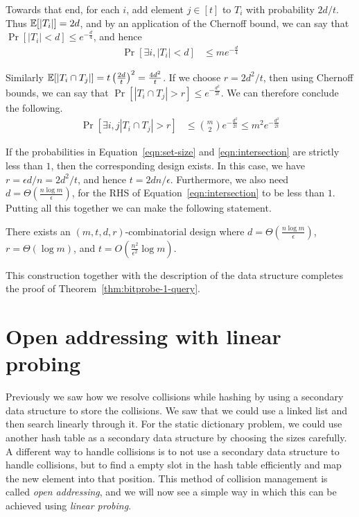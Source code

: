 Towards that end, for each $i$, add element $j\in [t]$ to $T_i$ with probability
$2d/t$. Thus $\mathbb{E}[|T_i|] = 2d$, and by an application of the Chernoff bound, we
can say that $\Pr\left[|T_i| < d \right] \leq e^{-\frac{d}{4}}$, and hence
\begin{align}
  \Pr\left[ \exists i, |T_i| < d \right] &\leq m e^{-\frac{d}{4}}
  \label{eqn:set-size}                                         
\end{align}

Similarly $\mathbb{E}[|T_i \cap T_j|] = t\left(\frac{2d}{t}\right)^2 =
\frac{4d^2}{t}$. If we choose $r = 2d^2/t$, then using Chernoff bounds, we can
say that $\Pr[|T_i \cap T_j| > r] \leq e^{-\frac{d^2}{2t}}$. We can therefore
conclude the following.
\begin{align}
  \Pr[ \exists i,j |T_i \cap T_j| > r] &\leq \binom{m}{2} e^{-\frac{d^2}{2t}} \leq m^2 e^{-\frac{d^2}{2t}}
  \label{eqn:intersection}
\end{align}

If the probabilities in Equation~\ref{eqn:set-size} and \ref{eqn:intersection}
are strictly less than $1$, then the corresponding design exists. In this case,
we have $r = \epsilon d/n = 2d^2 /t$, and hence $t = 2dn/\epsilon$. Furthermore,
we also need $d = \Theta\left(\frac{n\log m}{\epsilon} \right)$, for the RHS of
Equation~\ref{eqn:intersection} to be less than $1$. Putting all this together
we can make the following statement.
\begin{lemma}
  There exists an $(m,t,d,r)$-combinatorial design where
  $d = \Theta\left(\frac{n\log m}{\epsilon} \right)$, $r = \Theta(\log m)$, and
  $t = O\left(\frac{n^2}{\epsilon^2} \log m \right)$.
\end{lemma}

This construction together with the description of the data structure completes
the proof of Theorem~\ref{thm:bitprobe-1-query}.

\section{Open addressing with linear probing}

Previously we saw how we resolve collisions while hashing by using a secondary
data structure to store the collisions. We saw that we could use a linked list
and then search linearly through it. For the static dictionary problem, we could
use another hash table as a secondary data structure by choosing the sizes
carefully. A different way to handle collisions is to not use a secondary data
structure to handle collisions, but to find a empty slot in the hash table
efficiently and map the new element into that position. This method of collision
management is called \emph{open addressing}, and we will now see a simple way in
which this can be achieved using \emph{linear probing}.

